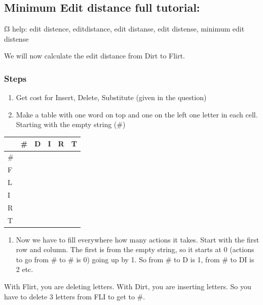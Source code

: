 \documentclass[
  11pt,
  british,
]{article}
\providecommand{\tightlist}{%
  \setlength{\itemsep}{0pt}\setlength{\parskip}{0pt}}
\begin{document}
\hypertarget{minimum-edit-distance-full-tutorial}{%
\subsection{Minimum Edit distance full
tutorial:}\label{minimum-edit-distance-full-tutorial}}

f3 help: edit distence, editdistance, edit distanse, edit distense,
minimum edit distense

We will now calculate the edit distance from Dirt to Flirt.

\hypertarget{steps}{%
\subsubsection{Steps}\label{steps}}

\begin{enumerate}
\def\labelenumi{\arabic{enumi}.}
\tightlist
\item
  Get cost for Insert, Delete, Substitute (given in the question)
\item
  Make a table with one word on top and one on the left one letter in
  each cell. Starting with the empty string (\#)
\end{enumerate}

\begin{longtable}[]{@{}llllll@{}}
\toprule
& \# & D & I & R & T \\
\midrule
\endhead
\# & & & & & \\
F & & & & & \\
L & & & & & \\
I & & & & & \\
R & & & & & \\
T & & & & & \\
\bottomrule
\end{longtable}

\begin{enumerate}
\def\labelenumi{\arabic{enumi}.}
\setcounter{enumi}{2}
\tightlist
\item
  Now we have to fill everywhere how many actions it takes. Start with
  the first row and column. The first is from the empty string, so it
  starts at 0 (actions to go from \# to \# is 0) going up by 1. So from
  \# to D is 1, from \# to DI is 2 etc.
\end{enumerate}

With Flirt, you are deleting letters. With Dirt, you are inserting
letters. So you have to delete 3 letters from FLI to get to \#.
\end{document}
